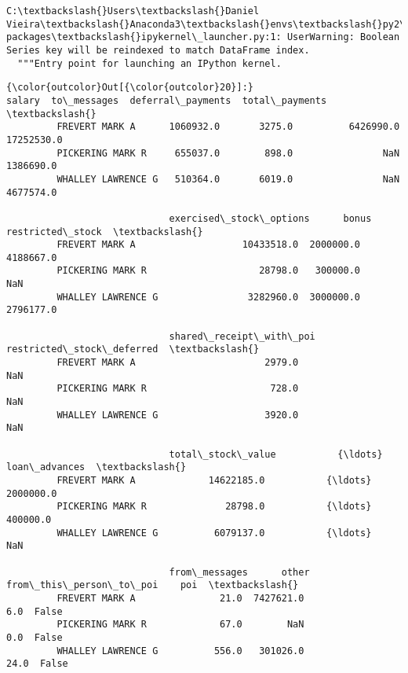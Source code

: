 \documentclass[11pt]{article}
\begin{document}
    \begin{Verbatim}[commandchars=\\\{\}]
C:\textbackslash{}Users\textbackslash{}Daniel Vieira\textbackslash{}Anaconda3\textbackslash{}envs\textbackslash{}py2\textbackslash{}lib\textbackslash{}site-packages\textbackslash{}ipykernel\_launcher.py:1: UserWarning: Boolean Series key will be reindexed to match DataFrame index.
  """Entry point for launching an IPython kernel.

    \end{Verbatim}

\begin{Verbatim}[commandchars=\\\{\}]
{\color{outcolor}Out[{\color{outcolor}20}]:}                        salary  to\_messages  deferral\_payments  total\_payments  \textbackslash{}
         FREVERT MARK A      1060932.0       3275.0          6426990.0      17252530.0   
         PICKERING MARK R     655037.0        898.0                NaN       1386690.0   
         WHALLEY LAWRENCE G   510364.0       6019.0                NaN       4677574.0   
         
                             exercised\_stock\_options      bonus  restricted\_stock  \textbackslash{}
         FREVERT MARK A                   10433518.0  2000000.0         4188667.0   
         PICKERING MARK R                    28798.0   300000.0               NaN   
         WHALLEY LAWRENCE G                3282960.0  3000000.0         2796177.0   
         
                             shared\_receipt\_with\_poi  restricted\_stock\_deferred  \textbackslash{}
         FREVERT MARK A                       2979.0                        NaN   
         PICKERING MARK R                      728.0                        NaN   
         WHALLEY LAWRENCE G                   3920.0                        NaN   
         
                             total\_stock\_value           {\ldots}            loan\_advances  \textbackslash{}
         FREVERT MARK A             14622185.0           {\ldots}                2000000.0   
         PICKERING MARK R              28798.0           {\ldots}                 400000.0   
         WHALLEY LAWRENCE G          6079137.0           {\ldots}                      NaN   
         
                             from\_messages      other  from\_this\_person\_to\_poi    poi  \textbackslash{}
         FREVERT MARK A               21.0  7427621.0                      6.0  False   
         PICKERING MARK R             67.0        NaN                      0.0  False   
         WHALLEY LAWRENCE G          556.0   301026.0                     24.0  False   
         

\end{Verbatim}
\end{document}
